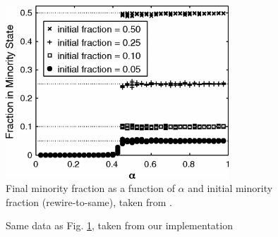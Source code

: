 \documentclass[11pt]{article}
\begin{document}
\begin{figure}
  \centering
  \includegraphics[height=65mm]{rwToSameBifDiag}
  \caption{Final minority fraction as a function of $\alpha$ and initial minority fraction (rewire-to-same), taken from \cite{durret:pnas12}.}
  \label{fig:durretRWtoSameBD}
\end{figure}

\begin{figure}
  \centering
  \hspace{3mm}
  \caption{Same data as Fig. \ref{fig:durretRWtoSameBD}, taken from our implementation}
  \label{fig:myRWtoSameBD}
\end{figure}
\end{document}

